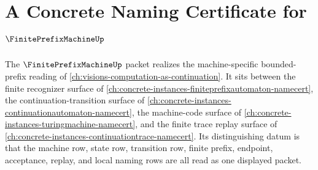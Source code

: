 \chapter{A Concrete Naming Certificate for $\FinitePrefixMachineUp$}
\label{ch:concrete-instances-finite-prefix-machine-namecert}

The $\FinitePrefixMachineUp$ packet realizes the machine-specific bounded-prefix reading of \autoref{ch:visions-computation-as-continuation}. It sits between the finite recognizer surface of \autoref{ch:concrete-instances-finiteprefixautomaton-namecert}, the continuation-transition surface of \autoref{ch:concrete-instances-continuationautomaton-namecert}, the machine-code surface of \autoref{ch:concrete-instances-turingmachine-namecert}, and the finite trace replay surface of \autoref{ch:concrete-instances-continuationtrace-namecert}. Its distinguishing datum is that the machine row, state row, transition row, finite prefix, endpoint, acceptance, replay, and local naming rows are all read as one displayed packet.



